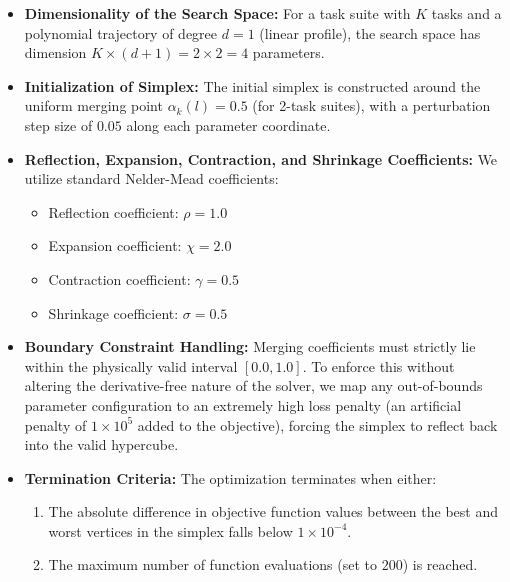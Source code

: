 \begin{itemize}
    \item \textbf{Dimensionality of the Search Space:} For a task suite with $K$ tasks and a polynomial trajectory of degree $d=1$ (linear profile), the search space has dimension $K \times (d+1) = 2 \times 2 = 4$ parameters.
    \item \textbf{Initialization of Simplex:} The initial simplex is constructed around the uniform merging point $\alpha_k(l) = 0.5$ (for 2-task suites), with a perturbation step size of $0.05$ along each parameter coordinate.
    \item \textbf{Reflection, Expansion, Contraction, and Shrinkage Coefficients:} We utilize standard Nelder-Mead coefficients:
    \begin{itemize}
        \item Reflection coefficient: $\rho = 1.0$
        \item Expansion coefficient: $\chi = 2.0$
        \item Contraction coefficient: $\gamma = 0.5$
        \item Shrinkage coefficient: $\sigma = 0.5$
    \end{itemize}
    \item \textbf{Boundary Constraint Handling:} Merging coefficients must strictly lie within the physically valid interval $[0.0, 1.0]$.
To enforce this without altering the derivative-free nature of the solver, we map any out-of-bounds parameter configuration to an extremely high loss penalty (an artificial penalty of $1 \times 10^{5}$ added to the objective), forcing the simplex to reflect back into the valid hypercube.
    \item \textbf{Termination Criteria:} The optimization terminates when either:
    \begin{enumerate}
        \item The absolute difference in objective function values between the best and worst vertices in the simplex falls below $1 \times 10^{-4}$.
        \item The maximum number of function evaluations (set to $200$) is reached.
    \end{enumerate}
\end{itemize}

